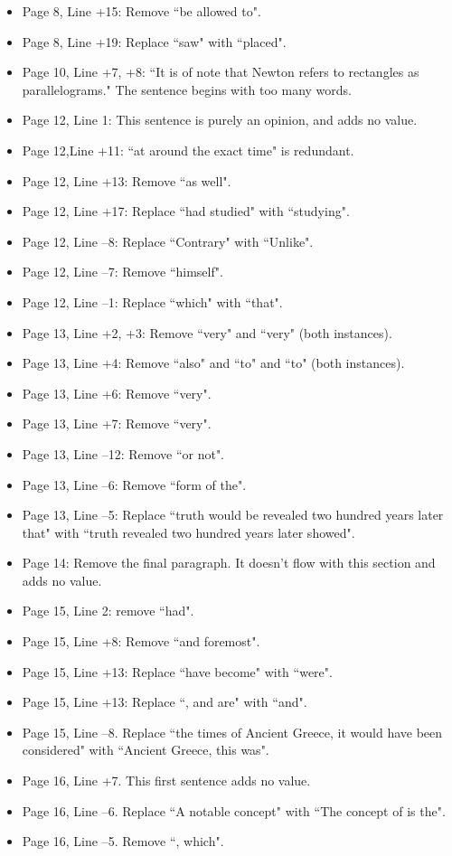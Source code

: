 \documentclass[11pt]{article}
\begin{document}
\begin{itemize}
\begin{itemize}
		\item Page 8, Line +15: Remove ``be allowed to".
		\item Page 8, Line +19: Replace ``saw" with ``placed".
		\item Page 10, Line +7, +8: ``It is of note that Newton refers to rectangles as parallelograms." The sentence begins with too many words.
		\item Page 12, Line 1: This sentence is purely an opinion, and adds no value.
		\item Page 12,Line +11: ``at around the exact time" is redundant.
		\item Page 12, Line +13: Remove ``as well".
		\item Page 12, Line +17: Replace ``had studied" with ``studying".
		\item Page 12, Line --8: Replace ``Contrary" with ``Unlike".
		\item Page 12, Line --7: Remove ``himself".
		\item Page 12, Line --1: Replace ``which" with ``that".
		\item Page 13, Line +2, +3: Remove ``very" and ``very" (both instances).
		\item Page 13, Line +4: Remove ``also" and ``to" and ``to" (both instances).
		\item Page 13, Line +6: Remove ``very".
		\item Page 13, Line +7: Remove ``very".
		\item Page 13, Line --12: Remove ``or not".
		\item Page 13, Line --6: Remove ``form of the".
		\item Page 13, Line --5: Replace ``truth would be revealed two hundred years later that" with ``truth revealed two hundred years later showed".
		\item Page 14: Remove the final paragraph. It doesn't flow with this section and adds no value.
		\item Page 15, Line 2: remove ``had".
		\item Page 15, Line +8: Remove ``and foremost".
		\item Page 15, Line +13: Replace ``have become" with ``were".
		\item Page 15, Line +13: Replace ``, and are" with ``and".
		\item Page 15, Line --8. Replace ``the times of Ancient Greece, it would have been considered" with ``Ancient Greece, this was".
		\item Page 16, Line +7. This first sentence adds no value.
		\item Page 16, Line --6. Replace ``A notable concept" with ``The concept of is the".
		\item Page 16, Line --5. Remove ``, which".
	\end{itemize}
	

\end{itemize}
\end{document}
